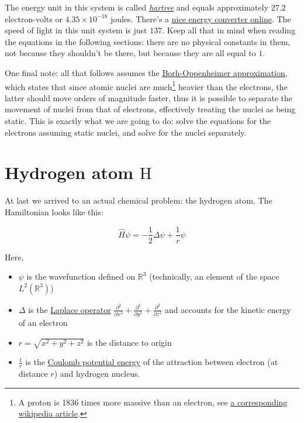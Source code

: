 \documentclass{article}
\newcommand{\molecule}[1]{\textrm{#1}}
\begin{document}
The energy unit in this system is called \href{https://en.wikipedia.org/wiki/Hartree}{\textit{hartree}} and equals approximately \(27.2\) electron-volts or \(4.35\times 10^{-18}\) joules. There's a \href{http://www.colby.edu/chemistry/PChem/Hartree.html}{nice energy converter online}. The speed of light in this unit system is just \(137\). Keep all that in mind when reading the equations in the following sections: there are no physical constants in them, not because they shouldn't be there, but because they are all equal to \(1\).

One final note: all that follows assumes the \href{https://en.wikipedia.org/wiki/Born\%E2\%80\%93Oppenheimer_approximation}{Borh-Oppenheimer approximation}, which states that since atomic nuclei are much\footnote{A proton is 1836 times more massive than an electron, see \href{https://en.wikipedia.org/wiki/Proton-to-electron_mass_ratio}{a corresponding wikipedia article}.} heavier than the electrons, the latter should move orders of magnitude faster, thus it is possible to separate the movement of nuclei from that of electrons, effectively treating the nuclei as being static. This is exactly what we are going to do: solve the equations for the electrons assuming static nuclei, and solve for the nuclei separately.

\newpage

\section{Hydrogen atom \(\molecule{H}\)}

At last we arrived to an actual chemical problem: the hydrogen atom. The Hamiltonian looks like this:

\begin{equation}
\hat H\psi = -\frac{1}{2} \Delta \psi + \frac{1}{r}\psi
\end{equation}

Here, 

\begin{itemize}
\item \(\psi\) is the wavefunction defined on \(\mathbb R^3\) (technically, an element of the space \(L^2(\mathbb R^3)\))
\item \(\Delta\) is the \href{https://en.wikipedia.org/wiki/Laplace_operator}{Laplace operator} \(\frac{\partial^2}{\partial x^2}+\frac{\partial^2}{\partial y^2}+\frac{\partial^2}{\partial z^2}\) and accounts for the kinetic energy of an electron
\item \(r=\sqrt{x^2+y^2+z^2}\) is the distance to origin
\item \(\frac{1}{r}\) is the \href{https://en.wikipedia.org/wiki/Electric_potential_energy}{Coulomb potential energy} of the attraction between electron (at distance \(r\)) and hydrogen nucleus.
\end{itemize}
\end{document}
